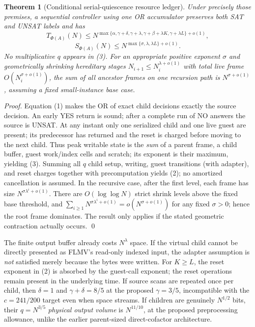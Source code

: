 \documentclass[11pt]{article}
\newtheorem{theorem}{Theorem}
\begin{document}
\begin{theorem}[Conditional serial-quiescence resource ledger]
Under precisely those premises, a sequential controller using one OR accumulator preserves both SAT and UNSAT labels and has
\[
T_{\Phi(A)}(N)\le N^{\max\{\alpha,\gamma+\delta,\gamma+\lambda,
 \gamma+\beta+\lambda K,\gamma+\lambda L\}+o(1)}, \tag{2}
\]
\[
S_{\Phi(A)}(N)\le N^{\max\{\sigma,\lambda,\lambda L\}+o(1)}. \tag{3}
\]
No multiplicative $q$ appears in (3). For an appropriate positive exponent $\sigma$ and geometrically shrinking hereditary stages $N_{i+1}\le N_i^{\lambda+o(1)}$ with total live frame $O(N_i^{\sigma+o(1)})$, the sum of all \emph{ancestor frames on one recursion path} is $N^{\sigma+o(1)}$, assuming a fixed small-instance base case.
\end{theorem}
\begin{proof}
Equation (1) makes the OR of exact child decisions exactly the source decision. An early YES return is sound; after a complete run of NO answers the source is UNSAT. At any instant only one serialized child and one live guest are present; its predecessor has returned and the reset is charged before moving to the next child. Thus peak writable state is the \emph{sum} of a parent frame, a child buffer, guest work/index cells and scratch; its exponent is their maximum, yielding (3). Summing all $q$ child setup, writing, guest transitions (with adapter), and reset charges together with precomputation yields (2); no amortized cancellation is assumed. In the recursive case, after the first level, each frame has size $N^{\sigma\lambda^i+o(1)}$. There are $O(\log\log N)$ strict shrink levels above the fixed base threshold, and $\sum_{i\geq1}N^{\sigma\lambda^i+o(1)}=o(N^{\sigma+o(1)})$ for any fixed $\sigma>0$; hence the root frame dominates. The result only applies if the stated geometric contraction actually occurs. \qed
\end{proof}
The finite output buffer already costs $N^{\lambda}$ space. If the virtual child cannot be directly presented as FLMV's read-only indexed input, the adapter assumption is \emph{not} satisfied merely because the bytes were written. For $K\geq L$, the reset exponent in (2) is absorbed by the guest-call exponent; the reset operations remain present in the underlying time. If source scans are repeated once per child, then $\delta=1$ and $\gamma+\delta=8/5$ at the proposed $\gamma=3/5$, incompatible with the $c=241/200$ target even when space streams. If children are genuinely $N^{1/2}$ bits, their $q=N^{3/5}$ \emph{physical output volume} is $N^{11/10}$, at the proposed preprocessing allowance, unlike the earlier parent-sized direct-cofactor architecture.
\end{document}
